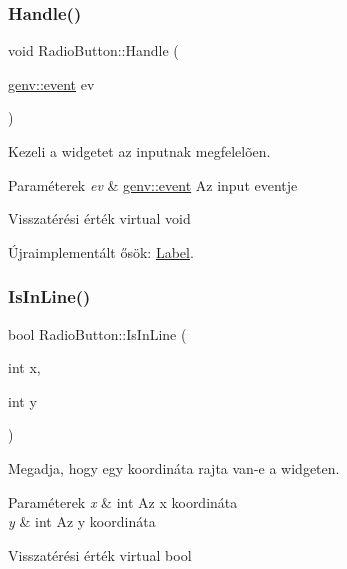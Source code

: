 \subsubsection{\texorpdfstring{Handle()}{Handle()}}
{\footnotesize\ttfamily void Radio\+Button\+::\+Handle (\begin{DoxyParamCaption}\item[{\hyperlink{structgenv_1_1event}{genv\+::event}}]{ev }\end{DoxyParamCaption})\hspace{0.3cm}{\ttfamily [virtual]}}



Kezeli a widgetet az inputnak megfelelõen. 


\begin{DoxyParams}{Paraméterek}
{\em ev} & \hyperlink{structgenv_1_1event}{genv\+::event} Az input eventje \\
\hline
\end{DoxyParams}
\begin{DoxyReturn}{Visszatérési érték}
virtual void 
\end{DoxyReturn}


Újraimplementált ősök\+: \hyperlink{class_label_a5cf04da7def075453b5c0fda93a1b575}{Label}.

\mbox{\label{class_radio_button_a94ab27ee37cdd639a185cb746ad7b32f}} 
\subsubsection{\texorpdfstring{Is\+In\+Line()}{IsInLine()}}
{\footnotesize\ttfamily bool Radio\+Button\+::\+Is\+In\+Line (\begin{DoxyParamCaption}\item[{int}]{x,  }\item[{int}]{y }\end{DoxyParamCaption})\hspace{0.3cm}{\ttfamily [virtual]}}



Megadja, hogy egy koordináta rajta van-\/e a widgeten. 


\begin{DoxyParams}{Paraméterek}
{\em x} & int Az x koordináta \\
\hline
{\em y} & int Az y koordináta \\
\hline
\end{DoxyParams}
\begin{DoxyReturn}{Visszatérési érték}
virtual bool 
\end{DoxyReturn}


